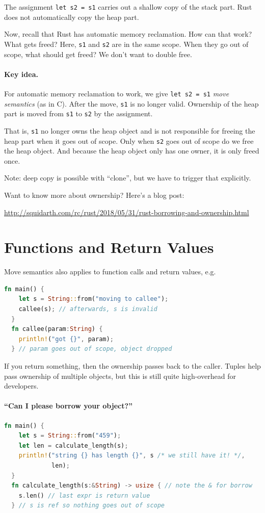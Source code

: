 \documentclass[a4paper]{report}
\newcommand{\CPP}{C\nolinebreak\hspace{-.05em}\raisebox{.4ex}{\tiny\bf +}\nolinebreak\hspace{-.10em}\raisebox{.4ex}{\tiny\bf +}}
\def\CPP{{C\nolinebreak[4]\hspace{-.05em}\raisebox{.4ex}{\tiny\bf ++}}}
\begin{document}
The assignment {\tt let s2 = s1} carries out a shallow copy of the stack part. Rust
does not automatically copy the heap part.

Now, recall that Rust has automatic memory reclamation. How can that
work? What gets freed?  Here, {\tt s1} and {\tt s2} are in the same
scope. When they go out of scope, what should get freed? We
don't want to double free.

\paragraph{Key idea.} For automatic memory reclamation to work, we give {\tt let s2 = s1} \emph{move semantics}
(as in \CPP). After the move, {\tt s1} is no longer valid.
Ownership of the heap part is moved from {\tt s1} to {\tt s2} by the assignment.

That is, {\tt s1} no longer owns the heap object and is not responsible for freeing the heap part
when it goes out of scope. Only when {\tt s2} goes out of scope do we free the heap object.
And because the heap object only has one owner, it is only freed once.

Note: deep copy is possible with ``clone'', but we have to trigger that explicitly.

Want to know more about ownership? Here's a blog post:
\begin{center}
  \url{http://squidarth.com/rc/rust/2018/05/31/rust-borrowing-and-ownership.html}
\end{center}
\section*{Functions and Return Values}

Move semantics also applies to function calls and return values, e.g.
\begin{lstlisting}[language=Rust]
  fn main() {
    let s = String::from("moving to callee");
    callee(s); // afterwards, s is invalid
  }
  fn callee(param:String) {
    println!("got {}", param);
  } // param goes out of scope, object dropped
\end{lstlisting}
If you return something, then the ownership passes back to the caller.
Tuples help pass ownership of multiple objects, but this is still quite
high-overhead for developers.

\paragraph{``Can I please borrow your object?''}
\begin{lstlisting}[language=Rust]
  fn main() {
    let s = String::from("459");
    let len = calculate_length(s);
    println!("string {} has length {}", s /* we still have it! */,
             len);
  }
  fn calculate_length(s:&String) -> usize { // note the & for borrow
    s.len() // last expr is return value
  } // s is ref so nothing goes out of scope
\end{lstlisting}
  
\end{document}
